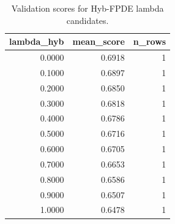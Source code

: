 \begin{table}[t]
\caption{Validation scores for Hyb-FPDE lambda candidates.}
\label{tab:lambda_distribution_computed}
\centering
\begin{tabular}{rrr}
\toprule
lambda\_hyb & mean\_score & n\_rows \\
\midrule
0.0000 & 0.6918 & 1 \\
0.1000 & 0.6897 & 1 \\
0.2000 & 0.6850 & 1 \\
0.3000 & 0.6818 & 1 \\
0.4000 & 0.6786 & 1 \\
0.5000 & 0.6716 & 1 \\
0.6000 & 0.6705 & 1 \\
0.7000 & 0.6653 & 1 \\
0.8000 & 0.6586 & 1 \\
0.9000 & 0.6507 & 1 \\
1.0000 & 0.6478 & 1 \\
\bottomrule
\end{tabular}

\end{table}
